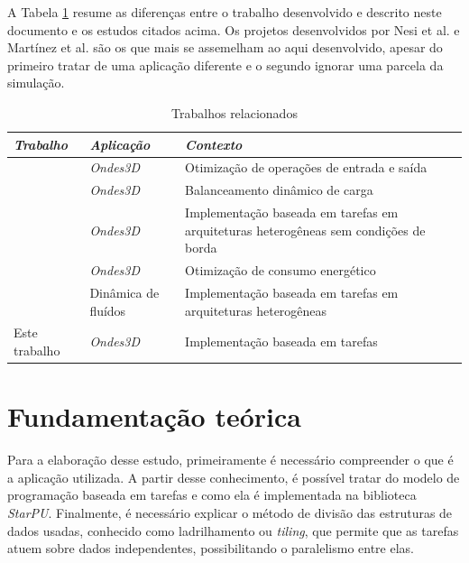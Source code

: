 \documentclass[cic,tc]{iiufrgs}
\begin{document}
A Tabela \ref{tbl:related_works} resume as diferenças entre o trabalho desenvolvido e descrito neste documento e os estudos citados acima. Os projetos desenvolvidos por Nesi et al. e Martínez et al. são
os que mais se assemelham ao aqui desenvolvido, apesar do primeiro tratar de uma aplicação diferente e o segundo ignorar uma parcela da simulação.

\begin{table}[htb!]
    \caption{Trabalhos relacionados}
    \begin{center}
        \begin{tabularx}{\textwidth}{l l X}
            \textit{Trabalho} & \textit{Aplicação} & \textit{Contexto} \\
            \hline
            \hline
            \cite{boito}    & \textit{Ondes3D} & Otimização de operações de entrada e saída \\
            \cite{dupros:hal-00797682}   & \textit{Ondes3D} & Balanceamento dinâmico de carga             \\
            \cite{victor} & \textit{Ondes3D} & Implementação baseada em tarefas em arquiteturas heterogêneas sem condições de borda             \\
            \cite{CASTRO2016108}   & \textit{Ondes3D} & Otimização de consumo energético             \\
            \cite{nesi}     & Dinâmica de fluídos & Implementação baseada em tarefas em arquiteturas heterogêneas \\
            Este trabalho   & \textit{Ondes3D} & Implementação baseada em tarefas             \\
            \hline
        \end{tabularx}
    \end{center}
    \label{tbl:related_works}
\end{table}

\chapter{Fundamentação teórica}\label{sec:theory}
Para a elaboração desse estudo, primeiramente é necessário compreender o que é a aplicação utilizada. A partir desse conhecimento, é possível tratar do modelo de programação
baseada em tarefas e como ela é implementada na biblioteca \textit{StarPU}. Finalmente, é necessário explicar o método de divisão das estruturas de dados usadas, conhecido como
ladrilhamento ou \textit{tiling}, que permite que as tarefas atuem sobre dados independentes, possibilitando o paralelismo entre elas.
\end{document}
